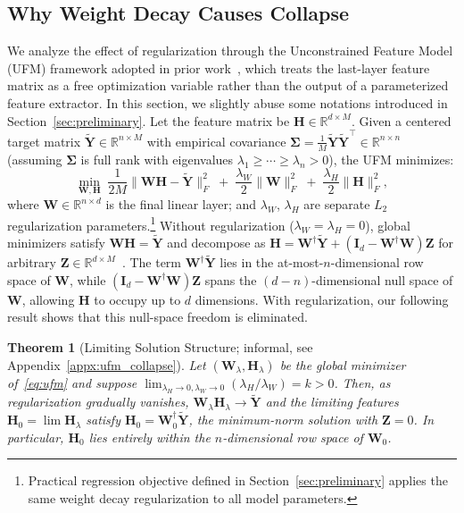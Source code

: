\documentclass{article}
\newcommand{\bW}{{\mathbf W}}
\newcommand{\bY}{{\mathbf Y}}
\newcommand{\bH}{{\mathbf H}}
\newcommand{\bI}{{\mathbf I}}
\newcommand{\bZ}{{\mathbf Z}}
\newcommand{\bSigma}{{\mathbf \Sigma}}
\theoremstyle{plain}
\newtheorem{theorem}{Theorem}[section]
\theoremstyle{definition}
\theoremstyle{remark}
\begin{document}
\subsection{Why Weight Decay Causes Collapse}
\label{sec:why_collapse}

We analyze the effect of regularization through the Unconstrained Feature Model (UFM) framework adopted in prior work~\citep{mixon2022ufm,andriopoulos2024prevalence}, which treats the last-layer feature matrix as a free optimization variable rather than the output of a parameterized feature extractor. In this section, we slightly abuse some notations introduced in Section~\ref{sec:preliminary}. Let the feature matrix be $\bH \in \mathbb{R}^{d \times M}$. Given a centered target matrix $\tilde{\bY} \in \mathbb{R}^{n \times M}$ with empirical covariance $\bSigma = \frac{1}{M}\tilde{\bY}\tilde{\bY}^\top \in \mathbb{R}^{n\times n}$ (assuming $\bSigma$ is full rank with eigenvalues $\lambda_1 \geq \cdots \geq \lambda_n > 0$), the UFM minimizes:
\begin{equation}
\min_{\bW, \bH} \;\frac{1}{2M} \|\bW\bH - \tilde{\bY}\|_F^2 \;+\; \frac{\lambda_W}{2}\|\bW\|_F^2 \;+\; \frac{\lambda_H}{2}\|\bH\|_F^2,
\label{eq:ufm}
\end{equation}
where $\bW \in \mathbb{R}^{n \times d}$ is the final linear layer; and $\lambda_W$, $\lambda_H$ are separate $L_2$ regularization parameters.\footnote{Practical regression objective defined in Section~\ref{sec:preliminary} applies the same weight decay regularization to all model parameters.} Without regularization ($\lambda_W = \lambda_H = 0$), global minimizers satisfy $\bW\bH = \tilde{\bY}$ and decompose as $\bH = \bW^\dagger \tilde{\bY} + (\bI_d - \bW^\dagger \bW)\bZ$ for arbitrary $\bZ \in \mathbb{R}^{d \times M}$~\citep{andriopoulos2024prevalence}. The term $\bW^\dagger \tilde{\bY}$ lies in the at-most-$n$-dimensional row space of $\bW$, while $(\bI_d - \bW^\dagger \bW)\bZ$ spans the $(d{-}n)$-dimensional null space of $\bW$, allowing $\bH$ to occupy up to $d$ dimensions. With regularization, our following result shows that this null-space freedom is eliminated.

\begin{theorem}[Limiting Solution Structure; informal, see Appendix~\ref{appx:ufm_collapse}]
\label{thm:limiting_informal} Let $(\bW_\lambda, \bH_\lambda)$ be the global minimizer of~\eqref{eq:ufm} and suppose $\lim_{\lambda_H \to 0, \lambda_W \to 0}(\lambda_H/\lambda_W) = k > 0$. Then, as regularization gradually vanishes, $\bW_\lambda \bH_\lambda \to \tilde{\bY}$ and the limiting features $\bH_0 = \lim \bH_\lambda$ satisfy $\bH_0 = \bW_0^\dagger \tilde{\bY}$, the minimum-norm solution with $\bZ = 0$. In particular, $\bH_0$ lies entirely within the $n$-dimensional row space of $\bW_0$.
\end{theorem}
\end{document}
